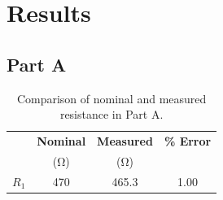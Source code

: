 \documentclass{article}
\begin{document}
\section{Results}
\label{sec:results}

\subsection{Part A}
\label{sec:result_a}

\begin{table}[hbtp]
  \centering
  \begin{tabular}{*{4}{c}}
    & \textbf{Nominal} & \textbf{Measured} & \textbf{\% Error} \\
    & (\si{\ohm}) & (\si{\ohm}) & \\
    \hline
    $R_1$ & 470 & 465.3 & 1.00 \\
  \end{tabular}
  \caption{\label{tab:percent_err} Comparison of nominal and measured resistance in Part A.}
\end{table}
\end{document}

